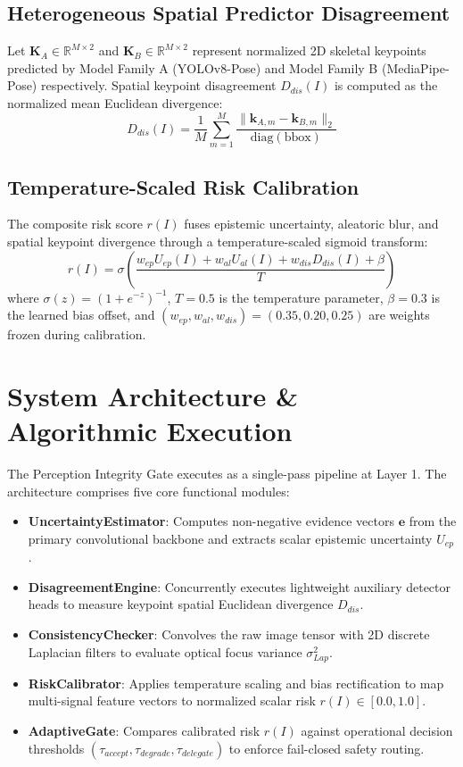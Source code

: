 \documentclass[conference]{IEEEtran}
\begin{document}
\subsection{Heterogeneous Spatial Predictor Disagreement}
Let $\mathbf{K}_A \in \mathbb{R}^{M \times 2}$ and $\mathbf{K}_B \in \mathbb{R}^{M \times 2}$ represent normalized 2D skeletal keypoints predicted by Model Family A (YOLOv8-Pose) and Model Family B (MediaPipe-Pose) respectively. Spatial keypoint disagreement $D_{dis}(I)$ is computed as the normalized mean Euclidean divergence:
\begin{equation}
D_{dis}(I) = \frac{1}{M} \sum_{m=1}^M \frac{\|\mathbf{k}_{A,m} - \mathbf{k}_{B,m}\|_2}{\text{diag}(\text{bbox})}
\end{equation}

\subsection{Temperature-Scaled Risk Calibration}
The composite risk score $r(I)$ fuses epistemic uncertainty, aleatoric blur, and spatial keypoint divergence through a temperature-scaled sigmoid transform:
\begin{equation}
r(I) = \sigma \left( \frac{w_{ep} U_{ep}(I) + w_{al} U_{al}(I) + w_{dis} D_{dis}(I) + \beta}{T} \right)
\end{equation}
where $\sigma(z) = (1 + e^{-z})^{-1}$, $T = 0.5$ is the temperature parameter, $\beta = 0.3$ is the learned bias offset, and $(w_{ep}, w_{al}, w_{dis}) = (0.35, 0.20, 0.25)$ are weights frozen during calibration.

\section{System Architecture & Algorithmic Execution}
The Perception Integrity Gate executes as a single-pass pipeline at Layer 1. The architecture comprises five core functional modules:
\begin{itemize}
    \item \textbf{UncertaintyEstimator}: Computes non-negative evidence vectors $\mathbf{e}$ from the primary convolutional backbone and extracts scalar epistemic uncertainty $U_{ep}$.
    \item \textbf{DisagreementEngine}: Concurrently executes lightweight auxiliary detector heads to measure keypoint spatial Euclidean divergence $D_{dis}$.
    \item \textbf{ConsistencyChecker}: Convolves the raw image tensor with 2D discrete Laplacian filters to evaluate optical focus variance $\sigma_{Lap}^2$.
    \item \textbf{RiskCalibrator}: Applies temperature scaling and bias rectification to map multi-signal feature vectors to normalized scalar risk $r(I) \in [0.0, 1.0]$.
    \item \textbf{AdaptiveGate}: Compares calibrated risk $r(I)$ against operational decision thresholds $(\tau_{accept}, \tau_{degrade}, \tau_{delegate})$ to enforce fail-closed safety routing.
\end{itemize}
\end{document}
